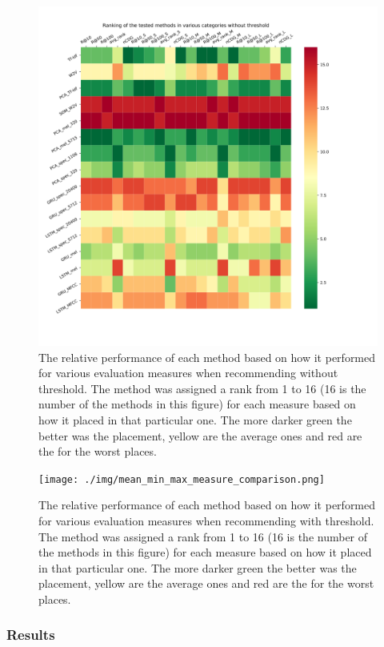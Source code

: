 \begin{figure}[h!]
    \centering
	\includegraphics[width=140mm]{./img/no_threshold_method_ranking.png}
	\caption{The relative performance of each method based on how it performed for various evaluation measures when recommending without threshold. The method was assigned a rank from 1 to 16 (16 is the number of the methods in this figure) for each measure based on how it placed in that particular one. The more darker green the better was the placement, yellow are the average ones and red are the for the worst places.}
	\label{fig:no_threshol_method_comparison}
\end{figure}
\begin{figure}[h!]
    \centering
	\texttt{[image: ./img/mean\_min\_max\_measure\_comparison.png]}
	\caption{The relative performance of each method based on how it performed for various evaluation measures when recommending with threshold. The method was assigned a rank from 1 to 16 (16 is the number of the methods in this figure) for each measure based on how it placed in that particular one. The more darker green the better was the placement, yellow are the average ones and red are the for the worst places.}
	\label{fig:threshold_method_comparison}
\end{figure}
\subsubsection{Results}
    

